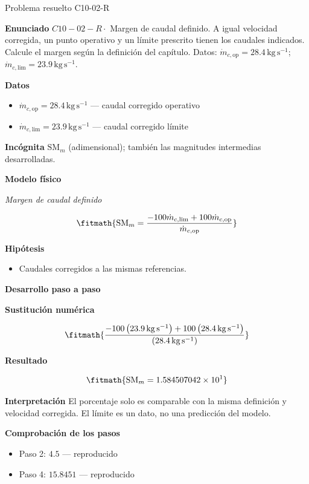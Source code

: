 \documentclass[10pt,openany]{book}
\begin{document}
\begin{studiumworked}{Problema resuelto C10-02-R}


\noindent\textbf{Enunciado}
\(C10-02-R \cdot\) Margen de caudal definido. A igual velocidad corregida, un punto operativo y un límite prescrito tienen los caudales indicados. Calcule el margen según la definición del capítulo. Datos: \(\dot{m}_{c,\mathrm{op}}=28.4\, \mathrm{kg}\,\mathrm{s}^{-1}\); \(\dot{m}_{c,\mathrm{lim}}=23.9\, \mathrm{kg}\,\mathrm{s}^{-1}\).

\noindent\textbf{Datos}
\begin{itemize}
\item $\dot{m}_{c,\mathrm{op}} = 28.4\,\mathrm{kg}\,\mathrm{s}^{-1}$ — caudal corregido operativo
\item $\dot{m}_{c,\mathrm{lim}} = 23.9\,\mathrm{kg}\,\mathrm{s}^{-1}$ — caudal corregido límite
\end{itemize}

\noindent\textbf{Incógnita}
$\mathrm{SM}_m$ (adimensional); también las magnitudes intermedias desarrolladas.

\noindent\textbf{Modelo físico}

\noindent\textit{Margen de caudal definido}

\[
\fitmath{\mathrm{SM}_m=\frac{- 100 \dot{m}_{c,\mathrm{lim}} + 100 \dot{m}_{c,\mathrm{op}}}{\dot{m}_{c,\mathrm{op}}}}
\]

\noindent\textbf{Hipótesis}
\begin{itemize}
\item Caudales corregidos a las mismas referencias.
\end{itemize}

\noindent\textbf{Desarrollo paso a paso}



\noindent\textbf{Sustitución numérica}

\[
\fitmath{\frac{- 100 \left(23.9\,\mathrm{kg}\,\mathrm{s}^{-1}\right) + 100 \left(28.4\,\mathrm{kg}\,\mathrm{s}^{-1}\right)}{\left(28.4\,\mathrm{kg}\,\mathrm{s}^{-1}\right)}}
\]

\noindent\textbf{Resultado}

\[
\fitmath{\mathrm{SM}_m=1.584507042\times10^{1}}
\]

\noindent\textbf{Interpretación}
El porcentaje solo es comparable con la misma definición y velocidad corregida. El límite es un dato, no una predicción del modelo.

\noindent\textbf{Comprobación de los pasos}
\begin{itemize}
\item Paso 2: $4.5$ — reproducido
\item Paso 4: $15.8451$ — reproducido
\end{itemize}


\end{studiumworked}
\end{document}
